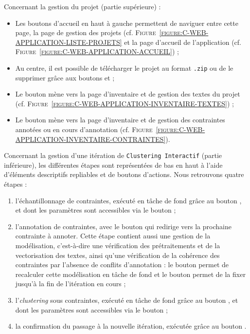 			Concernant la gestion du projet (partie supérieure) :
			\begin{itemize}
				\item Les boutons d'accueil en haut à gauche permettent de naviguer entre cette page, la page de gestion des projets (cf. \textsc{Figure~\ref{figure:C-WEB-APPLICATION-LISTE-PROJETS}} et la page d'accueil de l'application (cf. \textsc{Figure~\ref{figure:C-WEB-APPLICATION-ACCUEIL}}) ;
				\item Au centre, il est possible de télécharger le projet au format \texttt{.zip} ou de le supprimer grâce aux boutons \textguillemets{\faDownload} et \textguillemets{\faTrash} ;
				\item Le bouton  mène vers la page d'inventaire et de gestion des textes du projet (cf. \textsc{Figure~\ref{figure:C-WEB-APPLICATION-INVENTAIRE-TEXTES}}) ;
				\item Le bouton  mène vers la page d'inventaire et de gestion des contraintes annotées ou en cours d'annotation (cf. \textsc{Figure~\ref{figure:C-WEB-APPLICATION-INVENTAIRE-CONTRAINTES}}).
			\end{itemize}
			
			Concernant la gestion d'une itération de \texttt{Clustering Interactif} (partie inférieure), les différentes étapes sont représentées de bas en haut à l'aide d'éléments descriptifs repliables et de boutons d'actions.
			Nous retrouvons quatre étapes :
			\begin{enumerate}
				\item l'échantillonnage de contraintes, exécuté en tâche de fond grâce au bouton , et dont les paramètres sont accessibles via le bouton \textguillemets{\faCog} ;
				\item l'annotation de contraintes, avec le bouton  qui redirige vers la prochaine contrainte à annoter.
				Cette étape contient aussi une gestion de la modélisation, c'est-à-dire une vérification des prétraitements et de la vectorisation des textes, ainsi qu'une vérification de la cohérence des contraintes par l'absence de conflits d'annotation : le bouton  permet de recalculer cette modélisation en tâche de fond et le bouton  permet de la fixer jusqu'à la fin de l'itération en cours ;
				\item l'\textit{clustering} sous contraintes, exécuté en tâche de fond grâce au bouton , et dont les paramètres sont accessibles via le bouton \textguillemets{\faCog} ;
				\item la confirmation du passage à la nouvelle itération, exécutée grâce au bouton .
			\end{enumerate}
			
